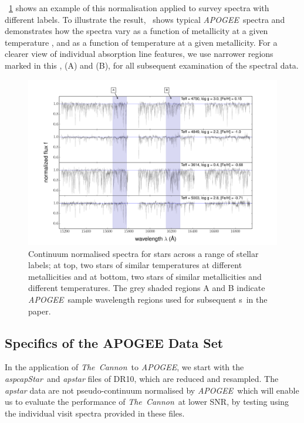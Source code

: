 \documentclass[12pt, preprint]{aastex}
\newcommand{\figurenames}{\figurename s}
\newcommand{\tc}{\textsl{The~Cannon}}
\newcommand{\apogee}{\textsl{APOGEE}}
\newcommand{\aspcapstar}{\textsl{aspcapStar}}
\begin{document}
\figurename~\ref{fig:norm} shows an example of this normalisation applied to survey spectra with different labels.
To illustrate the result, \figurename\ shows typical \apogee\ spectra and demonstrates how the spectra 
vary as a function of metallicity at a given temperature , and as a function of temperature at a given metallicity. 
For a clearer view of individual absorption line features, we use narrower regions marked in this \figurename, (A) and (B), for all subsequent examination of the spectral data. 



\begin{figure}[h!]
  \includegraphics[width=\hsize]{./plots/four_examples3.pdf}
\caption{Continuum normalised spectra for stars across a range of stellar labels; at top, two stars of similar temperatures at different metallicities and at bottom, two stars of similar metallicities and different temperatures. The grey shaded regions A and B indicate \apogee\ sample wavelength regions used for subsequent \figurenames\ in the paper.}
\label{fig:norm}
\end{figure}

\subsection{Specifics of the APOGEE Data Set}
\label{sec:Apogee_as_worked_Example}

In the application of \tc\ to  \apogee, we start with the \aspcapstar\ and \textit{apstar} files of DR10,
which are reduced and resampled. 
The \textit{apstar}  data are not pseudo-continuum normalised by \apogee\,
which will enable us to evaluate the performance of \tc\ at lower SNR, by testing using the individual visit spectra provided in these files. 
\end{document}
